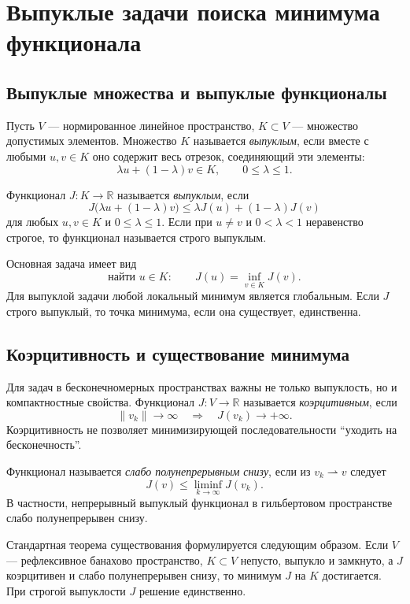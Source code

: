 \section{Выпуклые задачи поиска минимума функционала}
\label{sec:convex-functional-minimization}

\subsection{Выпуклые множества и выпуклые функционалы}

Пусть $V$ --- нормированное линейное пространство, $K\subset V$ --- множество
допустимых элементов. Множество $K$ называется \emph{выпуклым}, если вместе с любыми
$u,v\in K$ оно содержит весь отрезок, соединяющий эти элементы:
\[
    \lambda u+(1-\lambda)v\in K,
    \qquad 0\leq\lambda\leq 1.
\]

Функционал $J\colon K\to\mathbb R$ называется \emph{выпуклым}, если
\[
    J\bigl(\lambda u+(1-\lambda)v\bigr)
    \leq \lambda J(u)+(1-\lambda)J(v)
\]
для любых $u,v\in K$ и $0\leq\lambda\leq1$. Если при $u\neq v$ и
$0<\lambda<1$ неравенство строгое, то функционал называется строго выпуклым.

Основная задача имеет вид
\[
    \text{найти }u\in K:\qquad
    J(u)=\inf_{v\in K}J(v).
\]
Для выпуклой задачи любой локальный минимум является глобальным. Если $J$ строго
выпуклый, то точка минимума, если она существует, единственна.

\subsection{Коэрцитивность и существование минимума}

Для задач в бесконечномерных пространствах важны не только выпуклость, но и
компактностные свойства. Функционал $J\colon V\to\mathbb R$ называется
\emph{коэрцитивным}, если
\[
    \|v_k\|\to\infty
    \quad\Longrightarrow\quad
    J(v_k)\to+\infty.
\]
Коэрцитивность не позволяет минимизирующей последовательности ``уходить на
бесконечность''.

Функционал называется \emph{слабо полунепрерывным снизу}, если из
$v_k\rightharpoonup v$ следует
\[
    J(v)\leq \liminf_{k\to\infty}J(v_k).
\]
В частности, непрерывный выпуклый функционал в гильбертовом пространстве слабо
полунепрерывен снизу.

Стандартная теорема существования формулируется следующим образом. Если $V$ ---
рефлексивное банахово пространство, $K\subset V$ непусто, выпукло и замкнуто,
а $J$ коэрцитивен и слабо полунепрерывен снизу, то минимум $J$ на $K$
достигается. При строгой выпуклости $J$ решение единственно.

